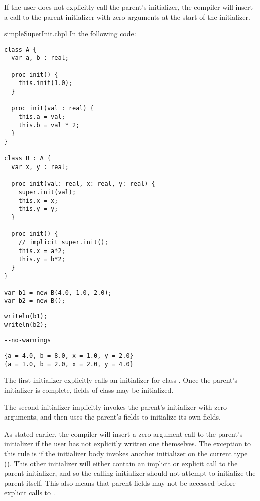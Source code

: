 If the user does not explicitly call the parent's initializer, the compiler
will insert a call to the parent initializer with zero arguments at the start
of the initializer.

\begin{chapelexample}{simpleSuperInit.chpl}
In the following code:
\begin{chapel}
\begin{verbatim}
class A {
  var a, b : real;

  proc init() {
    this.init(1.0);
  }

  proc init(val : real) {
    this.a = val;
    this.b = val * 2;
  }
}

class B : A {
  var x, y : real;

  proc init(val: real, x: real, y: real) {
    super.init(val);
    this.x = x;
    this.y = y;
  }

  proc init() {
    // implicit super.init();
    this.x = a*2;
    this.y = b*2;
  }
}

var b1 = new B(4.0, 1.0, 2.0);
var b2 = new B();
\end{verbatim}
\end{chapel}
\begin{chapelpost}
\begin{verbatim}
writeln(b1);
writeln(b2);
\end{verbatim}
\end{chapelpost}
\begin{chapelcompopts}
\begin{verbatim}
--no-warnings
\end{verbatim}
\end{chapelcompopts}
\begin{chapeloutput}
\begin{verbatim}
{a = 4.0, b = 8.0, x = 1.0, y = 2.0}
{a = 1.0, b = 2.0, x = 2.0, y = 4.0}
\end{verbatim}
\end{chapeloutput}
The first initializer explicitly calls an initializer for class . Once
the parent's initializer is complete, fields of class  may be
initialized.

The second initializer implicitly invokes the parent's initializer with zero
arguments, and then uses the parent's fields to initialize its own fields.
\end{chapelexample}

As stated earlier, the compiler will insert a zero-argument call to the
parent's initializer if the user has not explicitly written one themselves.
The exception to this rule is if the initializer body invokes another
initializer on the current type (). This
other initializer will either contain an implicit or explicit call to the
parent initializer, and so the calling initializer should not attempt to
initialize the parent itself. This also means that parent fields may not be
accessed before explicit calls to .

